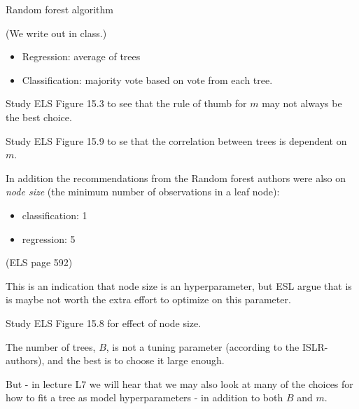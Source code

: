 \documentclass[
  ignorenonframetext,
]{beamer}
\providecommand{\tightlist}{%
  \setlength{\itemsep}{0pt}\setlength{\parskip}{0pt}}
\begin{document}
\begin{frame}

\begin{block}{Random forest algorithm}

(We write out in class.)

\begin{itemize}
\tightlist
\item
  Regression: average of trees
\item
  Classification: majority vote based on vote from each tree.
\end{itemize}

\end{block}

\end{frame}

\begin{frame}

Study ELS Figure 15.3 to see that the rule of thumb for \(m\) may not
always be the best choice.

Study ELS Figure 15.9 to se that the correlation between trees is
dependent on \(m\).

\end{frame}

\begin{frame}

In addition the recommendations from the Random forest authors were also
on \emph{node size} (the minimum number of observations in a leaf node):

\begin{itemize}
\tightlist
\item
  classification: 1
\item
  regression: 5
\end{itemize}

(ELS page 592)

This is an indication that node size is an hyperparameter, but ESL argue
that is is maybe not worth the extra effort to optimize on this
parameter.

Study ELS Figure 15.8 for effect of node size.

\end{frame}

\begin{frame}

The number of trees, \(B\), is not a tuning parameter (according to the
ISLR-authors), and the best is to choose it large enough.

But - in lecture L7 we will hear that we may also look at many of the
choices for how to fit a tree as model hyperparameters - in addition to
both \(B\) and \(m\).

\end{frame}
\end{document}
